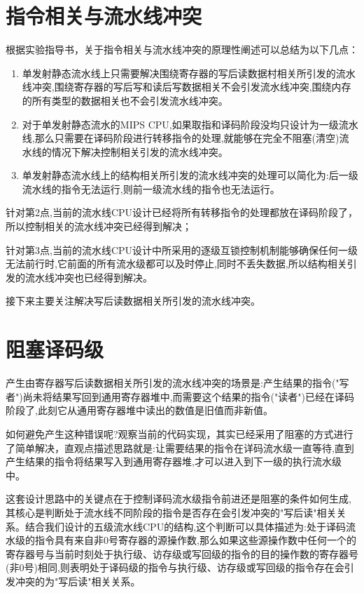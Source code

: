 \documentclass[a4paper]{article}
\begin{document}
	\section{指令相关与流水线冲突}
	根据实验指导书，关于指令相关与流水线冲突的原理性阐述可以总结为以下几点：
	\begin{enumerate}
		\item 单发射静态流水线上只需要解决围绕寄存器的写后读数据村相关所引发的流水线冲突,围绕寄存器的写后写和读后写数据相关不会引发流水线冲突,围绕内存的所有类型的数据相关也不会引发流水线冲突。
		\item 对于单发射静态流水的MIPS CPU,如果取指和译码阶段没均只设计为一级流水线,那么只需要在译码阶段进行转移指令的处理,就能够在完全不阻塞(清空)流水线的情况下解决控制相关引发的流水线冲突。
		\item 单发射静态流水线上的结构相关所引发的流水线冲突的处理可以简化为:后一级流水线的指令无法运行,则前一级流水线的指令也无法运行。
	\end{enumerate}
	
	针对第2点,当前的流水线CPU设计已经将所有转移指令的处理都放在译码阶段了，所以控制相关的流水线冲突已经得到解决；
	
	针对第3点,当前的流水线CPU设计中所采用的逐级互锁控制机制能够确保任何一级无法前行时,它前面的所有流水级都可以及时停止,同时不丢失数据,所以结构相关引发的流水线冲突也已经得到解决。
	
	接下来主要关注解决写后读数据相关所引发的流水线冲突。
	
	\section{阻塞译码级}
	产生由寄存器写后读数据相关所引发的流水线冲突的场景是:产生结果的指令("写者")尚未将结果写回到通用寄存器堆中,而需要这个结果的指令("读者")已经在译码阶段了,此刻它从通用寄存器堆中读出的数值是旧值而非新值。
	
	如何避免产生这种错误呢?观察当前的代码实现，其实已经采用了阻塞的方式进行了简单解决，直观点描述思路就是:让需要结果的指令在详码流水级一直等待,直到产生结果的指令将结果写入到通用寄存器堆,才可以进入到下一级的执行流水级中。
	
	这套设计思路中的关键点在于控制译码流水级指令前进还是阻塞的条件如何生成,其核心是判断处于流水线不同阶段的指令是否存在会引发冲突的"写后读"相关关系。结合我们设计的五级流水线CPU的结构,这个判断可以具体描述为:处于译码流水级的指令具有来自非0号寄存器的源操作数,那么如果这些源操作数中任何一个的寄存器号与当前时刻处于执行级、访存级或写回级的指令的目的操作数的寄存器号(非0号)相同,则表明处于译码级的指令与执行级、访存级或写回级的指令存在会引发冲突的为"写后读"相关关系。
	
\end{document}
